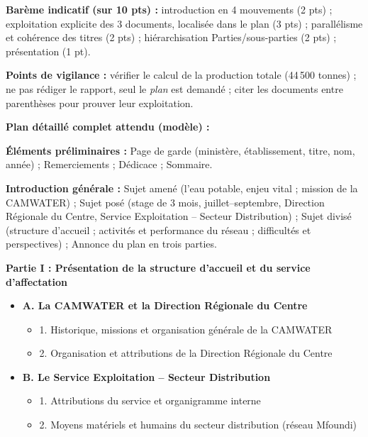 \documentclass[11pt]{article}
\begin{document}
\begin{corrige}
\textbf{Barème indicatif (sur 10 pts) :} introduction en 4 mouvements (2 pts) ; exploitation explicite des 3 documents, localisée dans le plan (3 pts) ; parallélisme et cohérence des titres (2 pts) ; hiérarchisation Parties/sous-parties (2 pts) ; présentation (1 pt).

\textbf{Points de vigilance :} vérifier le calcul de la production totale (44\,500 tonnes) ; ne pas rédiger le rapport, seul le \emph{plan} est demandé ; citer les documents entre parenthèses pour prouver leur exploitation.
\end{corrige}

\begin{corrige}
\textbf{Plan détaillé complet attendu (modèle) :}

\textbf{Éléments préliminaires :} Page de garde (ministère, établissement, titre, nom, année) ; Remerciements ; Dédicace ; Sommaire.

\textbf{Introduction générale :} Sujet amené (l'eau potable, enjeu vital ; mission de la CAMWATER) ; Sujet posé (stage de 3 mois, juillet--septembre, Direction Régionale du Centre, Service Exploitation -- Secteur Distribution) ; Sujet divisé (structure d'accueil ; activités et performance du réseau ; difficultés et perspectives) ; Annonce du plan en trois parties.

\textbf{Partie I : Présentation de la structure d'accueil et du service d'affectation}
\begin{itemize}
    \item \textbf{A. La CAMWATER et la Direction Régionale du Centre}
        \begin{itemize}
            \item 1. Historique, missions et organisation générale de la CAMWATER
            \item 2. Organisation et attributions de la Direction Régionale du Centre
        \end{itemize}
    \item \textbf{B. Le Service Exploitation -- Secteur Distribution}
        \begin{itemize}
            \item 1. Attributions du service et organigramme interne
            \item 2. Moyens matériels et humains du secteur distribution (réseau Mfoundi)
        \end{itemize}
\end{itemize}


\end{corrige}
\end{document}
